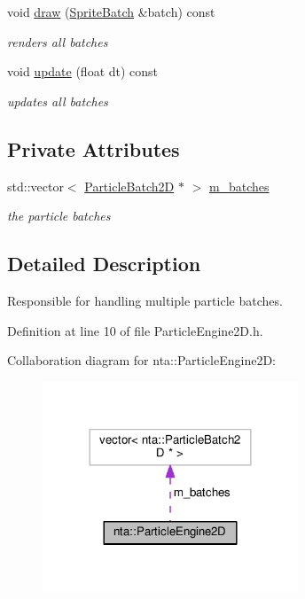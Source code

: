 \begin{DoxyCompactItemize}
void \hyperlink{classnta_1_1ParticleEngine2D_a759937cf45e74162ce85269ddf59237b}{draw} (\hyperlink{classnta_1_1SpriteBatch}{Sprite\+Batch} \&batch) const
\begin{DoxyCompactList}\small\item\em renders all batches \end{DoxyCompactList}\item 
\mbox{\label{classnta_1_1ParticleEngine2D_ad9c7f1be65505d86c23f5754e5fd9430}} 
void \hyperlink{classnta_1_1ParticleEngine2D_ad9c7f1be65505d86c23f5754e5fd9430}{update} (float dt) const
\begin{DoxyCompactList}\small\item\em updates all batches \end{DoxyCompactList}\end{DoxyCompactItemize}
\subsection*{Private Attributes}
\begin{DoxyCompactItemize}
\item 
\mbox{\label{classnta_1_1ParticleEngine2D_a7d928b070dbc09e68d13fd7f9d087549}} 
std\+::vector$<$ \hyperlink{classnta_1_1ParticleBatch2D}{Particle\+Batch2D} $\ast$ $>$ \hyperlink{classnta_1_1ParticleEngine2D_a7d928b070dbc09e68d13fd7f9d087549}{m\+\_\+batches}
\begin{DoxyCompactList}\small\item\em the particle batches \end{DoxyCompactList}\end{DoxyCompactItemize}


\subsection{Detailed Description}
Responsible for handling multiple particle batches. 

Definition at line 10 of file Particle\+Engine2\+D.\+h.



Collaboration diagram for nta\+:\+:Particle\+Engine2D\+:
\nopagebreak
\begin{figure}[H]
\begin{center}
\leavevmode
\includegraphics[width=216pt]{db/dbd/classnta_1_1ParticleEngine2D__coll__graph}
\end{center}
\end{figure}



